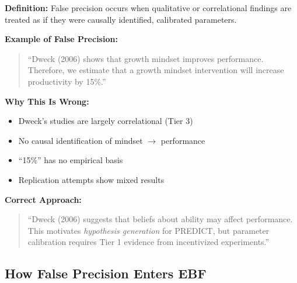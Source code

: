 \documentclass[11pt, a4paper]{article}
\begin{document}
\begin{tcolorbox}[colback=red!5!white, colframe=red!75!black,
    title=Warning: False Precision]

\textbf{Definition:} False precision occurs when qualitative or correlational findings are treated as if they were causally identified, calibrated parameters.

\textbf{Example of False Precision:}
\begin{quote}
``Dweck (2006) shows that growth mindset improves performance. Therefore, we estimate that a growth mindset intervention will increase productivity by 15\%.''
\end{quote}

\textbf{Why This Is Wrong:}
\begin{itemize}[nosep]
    \item Dweck's studies are largely correlational (Tier 3)
    \item No causal identification of mindset $\to$ performance
    \item ``15\%'' has no empirical basis
    \item Replication attempts show mixed results
\end{itemize}

\textbf{Correct Approach:}
\begin{quote}
``Dweck (2006) suggests that beliefs about ability may affect performance. This motivates \textit{hypothesis generation} for PREDICT, but parameter calibration requires Tier 1 evidence from incentivized experiments.''
\end{quote}

\end{tcolorbox}

\subsection{How False Precision Enters EBF}
\end{document}
